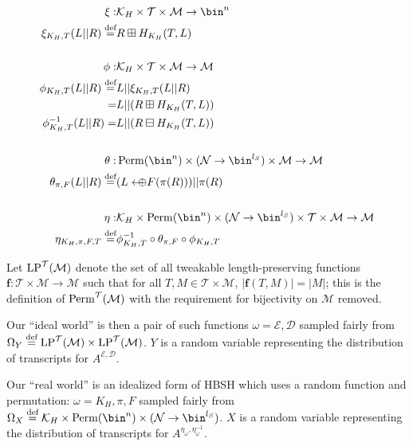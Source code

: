 \documentclass[eprint.tex]{subfiles}
\begin{document}
\begin{align*}
    \xi :& \mathcal{K}_H \times \mathcal{T} \times \mathcal{M} \rightarrow \bin^n \\
    \xi_{K_H, T}(L||R) \defeq& R \boxplus H_{K_H}(T, L) \\
    \vphantom{|} \\
    \phi :& \mathcal{K}_H \times \mathcal{T} \times \mathcal{M} \rightarrow \mathcal{M} \\
    \phi_{K_H, T}(L || R) \defeq& L || \xi_{K_H, T}(L||R) \\
    =& L || (R \boxplus H_{K_H}(T, L)) \\
    \phi^{-1}_{K_H, T}(L || R) =& L || (R \boxminus H_{K_H}(T, L)) \\
    \vphantom{|} \\
    \theta :& \Perm(\bin^n) \times (\mathcal{N} \rightarrow \bin^{l_S}) \times \mathcal{M} \rightarrow \mathcal{M} \\
    \theta_{\pi, F}(L || R) \defeq& (L \arrowoplus F(\pi(R))) || \pi(R) \\
    \vphantom{|} \\
    \eta :& \mathcal{K}_H \times \Perm(\bin^n) \times (\mathcal{N} \rightarrow \bin^{l_S}) \times \mathcal{T} \times \mathcal{M} \rightarrow \mathcal{M} \\
    \eta_{K_H, \pi, F, T} \defeq& \phi_{K_H,T}^{-1} \circ \theta_{\pi, F} \circ \phi_{K_H,T} \\
\end{align*}

Let $\operatorname{LP}^\mathcal{T}(\mathcal{M})$ denote the set of all
tweakable length-preserving functions
$\bm{f} : \mathcal{T} \times \mathcal{M} \rightarrow \mathcal{M}$
such that for all $T, M \in \mathcal{T} \times \mathcal{M}$,
$|\bm{f}(T, M)| = |M|$;
this is the definition of $\operatorname{Perm}^\mathcal{T}(\mathcal{M})$ with
the requirement for bijectivity on $\mathcal{M}$ removed.

Our ``ideal world''
is then a pair of such functions
$\omega = \mathcal{E}, \mathcal{D}$
sampled fairly from
$\Omega_Y \stackrel{\text{def}}{=} \operatorname{LP}^\mathcal{T}(\mathcal{M}) \times \operatorname{LP}^\mathcal{T}(\mathcal{M})$.
$Y$ is a random variable representing the distribution of transcripts for
$A^{\mathcal{E}, \mathcal{D}}$.

Our ``real world'' is an idealized form of HBSH which uses a random function and permutation:
$\omega = K_H, \pi, F$
sampled fairly from
$\Omega_X \defeq \mathcal{K}_H \times \Perm(\bin^n) \times (\mathcal{N} \rightarrow \bin^{l_S})$.
$X$ is a random variable representing the distribution of transcripts for
$A^{\eta_{\omega}, \eta_{\omega}^{-1}}$.
\end{document}

